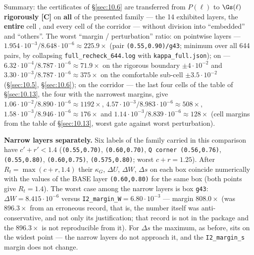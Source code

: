 Summary: the certificates of \S\ref{sec:10.6} are transferred from $P(\ell)$ to $\Gs(\ell)$ \textbf{rigorously [C]} on
\textbf{all} of the presented family --- the 14 exhibited layers, the \textbf{entire} cell \Qcell, and every cell of the
corridor --- without division into ``embedded'' and ``others''. The worst ``margin / perturbation''
ratio: on pointwise layers ---
$1.954\cdot 10^{-3} / 8.648\cdot 10^{-6} \approx 225.9\times$ (pair \texttt{(0.55,0.90)/\allowbreak g43}; minimum over all 644 pairs, by
collapsing \texttt{full\_\allowbreak recheck\_\allowbreak 644.log} with \texttt{kappa\_\allowbreak full.json});
on \Qcell{} --- $6.32\cdot 10^{-4} / 8.787\cdot 10^{-6} \approx 71.9\times$ on the rigorous boundary $\pm 4\cdot 10^{-2}$ and
$3.30\cdot 10^{-3} / 8.787\cdot 10^{-6} \approx 375\times$ on the comfortable sub-cell $\pm 3.5\cdot 10^{-2}$ (\S\ref{sec:10.5}, \S\ref{sec:10.6});
on the corridor --- the last four cells of the table of \S\ref{sec:10.13}, the four with the narrowest margins, give
$1.06\cdot 10^{-2} / 8.890\cdot 10^{-6} \approx 1192\times$, $4.57\cdot 10^{-3} / 8.983\cdot 10^{-6} \approx 508\times$,
$1.58\cdot 10^{-3} / 8.946\cdot 10^{-6} \approx 176\times$ and $1.14\cdot 10^{-3} / 8.839\cdot 10^{-6} \approx 128\times$
(cell margins from the table of \S\ref{sec:10.13}, worst gate against worst perturbation).

\textbf{Narrow layers separately.} Six labels of the family carried in this
comparison have $c'+r'<1.4$
(\texttt{(0.55,0.70)}, \texttt{(0.60,0.70)}, \texttt{Q corner (0.56,0.76)}, \texttt{(0.55,0.80)},
\texttt{(0.60,0.75)}, \texttt{(0.575,0.80)}; worst $c+r=1.25$). After $R_t=\max(c+r,1.4)$
their $\kappa_G$, $\Delta U$, $\Delta W$, $\Delta s$ on each box coincide numerically with the values of
the BASE layer \texttt{(0.60,0.80)} for the same box (both points give $R_t=1.4$). The worst
case among the narrow layers is box \texttt{g43}: $\Delta W=8.415\cdot 10^{-6}$ versus
\texttt{I2\_margin\_W}$=6.80\cdot 10^{-3}$ --- margin $808.0\times$ (was $896.3\times$ from an erroneous record,
that is, the number itself was anti-conservative, and not only its
justification; that record is not in the package and the $896.3\times$ is not
reproducible from it). For $\Delta s$ the maximum, as before, sits on the widest point --- the
narrow layers do not approach it, and the \texttt{I2\_margin\_s} margin does not change.

